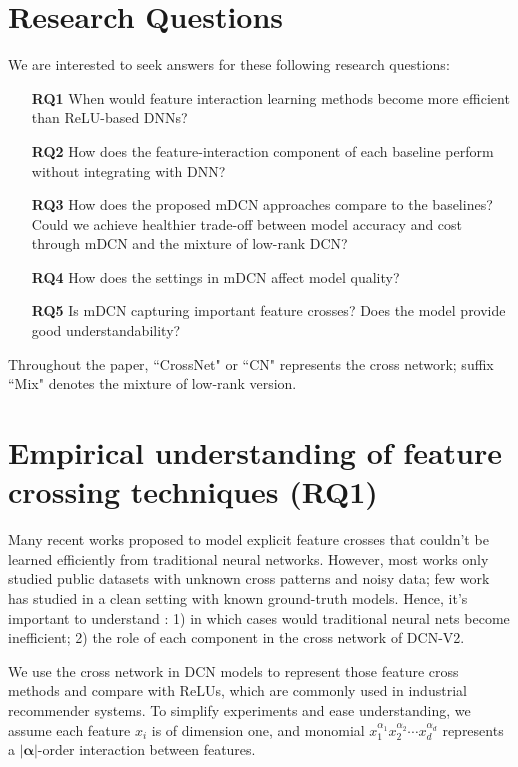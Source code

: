 \documentclass[sigconf]{acmart}
\newcommand{\vecalpha}{{\bm \alpha}}
\begin{document}
\section{Research Questions}
\label{sec:research_qs}
We are interested to seek answers for these following research questions:

\begin{itemize}[leftmargin=2.5em]
    \item[\bf RQ1]  When would feature interaction learning methods become more efficient than ReLU-based DNNs? \item[\bf RQ2]  How does the feature-interaction component of each baseline perform without integrating with DNN? 
    \item[\bf RQ3]  How does the proposed mDCN approaches compare to the baselines? Could we achieve healthier trade-off between model accuracy and cost through mDCN and the mixture of low-rank DCN?
    \item[\bf RQ4] How does the settings in mDCN affect model quality?
    \item[\bf RQ5] Is mDCN capturing important feature crosses? Does the model provide good understandability?
\end{itemize}

Throughout the paper, ``CrossNet" or ``CN" represents the cross network; suffix ``Mix" denotes the mixture of low-rank version. 

\section{Empirical understanding of feature crossing techniques (RQ1)}
\label{sec:exp_synthetic}
Many recent works \cite{wang2017deep, cheng2016wide, guo2017deepfm, beutel2018latent, qu2016product, lian2018xdeepfm, naumov2019deep} proposed to model explicit feature crosses that couldn't be learned efficiently from traditional neural networks. However, most works only studied public datasets with unknown cross patterns and noisy data; few work has studied in a clean setting with known ground-truth models. Hence, it's important to understand : 1) in which cases would traditional neural nets become inefficient; 2) the role of each component in the cross network of {DCN-V2}.

We use the cross network in DCN models to represent those feature cross methods and compare with ReLUs, which are commonly used in industrial recommender systems.
To simplify experiments and ease understanding, we assume each feature $x_i$ is of dimension one, and monomial $x_1^{\alpha_1}x_2^{\alpha_2}\cdots x_d^{\alpha_d}$ represents a $|\vecalpha|$-order interaction between features. 
\end{document}
